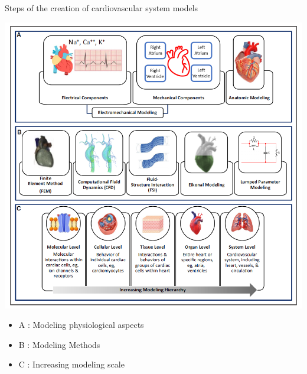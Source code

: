 \documentclass{beamer}
\begin{document}
\begin{frame}{Steps of the creation of cardiovascular system models}
\begin{minipage}{0.5\linewidth}
  \centering
  \includegraphics[width=0.95\linewidth]{images/creation_cv_system_models.png}
  \\
  \scriptsize{\textcite{sel2024digital}}
  \label{fig:step_creation_computational_model}
\end{minipage}\hfill
\begin{minipage}{0.45\linewidth}
  \begin{itemize}
    \item A : Modeling physiological aspects
    \item B : Modeling Methods
    \item C : Increasing modeling scale
  \end{itemize}
\end{minipage}
\end{frame}
\end{document}
